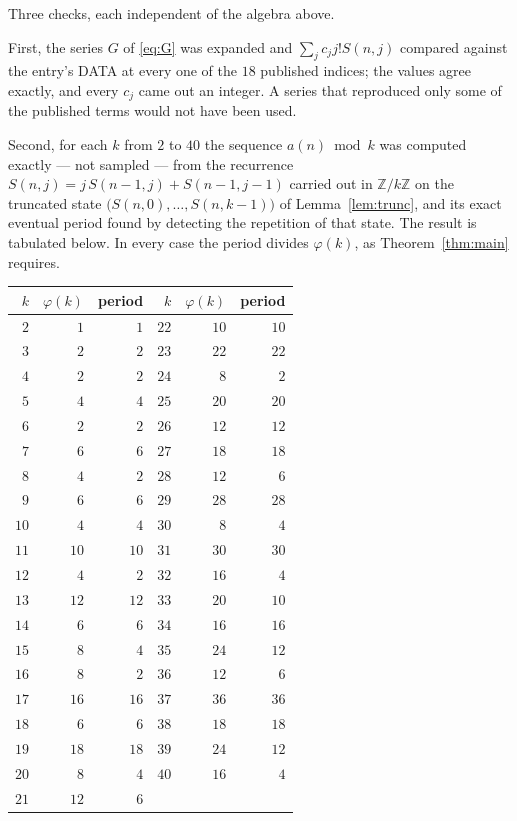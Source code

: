 \documentclass[11pt,a4paper]{article}
\theoremstyle{plain}
\theoremstyle{definition}
\begin{document}
Three checks, each independent of the algebra above.

First, the series $G$ of \eqref{eq:G} was expanded and $\sum_j c_j j! S(n,j)$ compared
against the entry's DATA at every one of the $18$ published indices; the values
agree exactly, and every $c_j$ came out an integer. A series that reproduced only some of
the published terms would not have been used.

Second, for each $k$ from $2$ to $40$ the sequence $a(n)\bmod k$ was computed exactly
--- not sampled --- from the recurrence $S(n,j)=j\,S(n-1,j)+S(n-1,j-1)$ carried out in
$\mathbb{Z}/k\mathbb{Z}$ on the truncated state
$\bigl(S(n,0),\dots,S(n,k-1)\bigr)$ of Lemma~\ref{lem:trunc}, and its exact eventual
period found by detecting the repetition of that state. The result is tabulated below.
In every case the period divides $\varphi(k)$, as Theorem~\ref{thm:main} requires.

\begin{center}\small
\begin{tabular}{rrr@{\qquad\qquad}rrr}
$k$ & $\varphi(k)$ & period & $k$ & $\varphi(k)$ & period \\ \hline
$2$ & $1$ & $1$ & $22$ & $10$ & $10$ \\
$3$ & $2$ & $2$ & $23$ & $22$ & $22$ \\
$4$ & $2$ & $2$ & $24$ & $8$ & $2$ \\
$5$ & $4$ & $4$ & $25$ & $20$ & $20$ \\
$6$ & $2$ & $2$ & $26$ & $12$ & $12$ \\
$7$ & $6$ & $6$ & $27$ & $18$ & $18$ \\
$8$ & $4$ & $2$ & $28$ & $12$ & $6$ \\
$9$ & $6$ & $6$ & $29$ & $28$ & $28$ \\
$10$ & $4$ & $4$ & $30$ & $8$ & $4$ \\
$11$ & $10$ & $10$ & $31$ & $30$ & $30$ \\
$12$ & $4$ & $2$ & $32$ & $16$ & $4$ \\
$13$ & $12$ & $12$ & $33$ & $20$ & $10$ \\
$14$ & $6$ & $6$ & $34$ & $16$ & $16$ \\
$15$ & $8$ & $4$ & $35$ & $24$ & $12$ \\
$16$ & $8$ & $2$ & $36$ & $12$ & $6$ \\
$17$ & $16$ & $16$ & $37$ & $36$ & $36$ \\
$18$ & $6$ & $6$ & $38$ & $18$ & $18$ \\
$19$ & $18$ & $18$ & $39$ & $24$ & $12$ \\
$20$ & $8$ & $4$ & $40$ & $16$ & $4$ \\
$21$ & $12$ & $6$ &  & & \\
\end{tabular}
\end{center}
\end{document}
